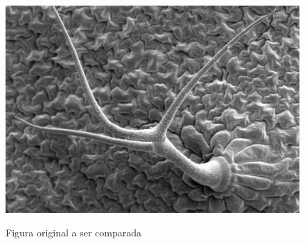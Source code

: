 \documentclass[10pt,a4paper]{article}
\begin{document}
\newpage
\begin{figure}[h!]
\begin{center}
\includegraphics[scale=0.35]{photos/m15_tricome}\label{cacheDados}
\caption{Figura original a ser comparada}
\end{center}
\end{figure}
\end{document}
